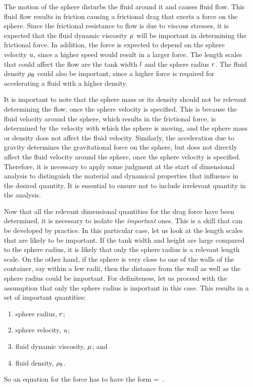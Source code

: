 \begin{solution}
The motion of the sphere disturbs the fluid around it and causes fluid flow. This fluid flow results in friction causing a frictional drag that exerts a force on the sphere. Since the frictional resistance to flow is due to viscous stresses, it is expected that the fluid dynamic viscosity $\mu$ will be important in determining the frictional force. In addition, the force is expected to depend on the sphere velocity $u$, since a higher speed would result in a larger force. The length scales that could affect the flow are the tank width $l$ and the sphere radius $r$. The fluid density $\rho_\text{fl}$ could also be important, since a higher force is required for accelerating a fluid with a higher density.

It is important to note that the sphere mass or its density should not be relevant determining the flow, once the sphere velocity is specified. This is because the fluid velocity around the sphere, which results in the frictional force, is determined by the velocity with which the sphere is moving, and the sphere mass or density does not affect the fluid velocity. Similarly, the acceleration due to gravity determines the gravitational force on the sphere, but does not directly affect the fluid velocity around the sphere, once the sphere velocity is specified. Therefore, it is necessary to apply some judgment at the start of dimensional analysis to distinguish the material and dynamical properties that influence in the desired quantity. It is essential to ensure not to include irrelevant quantity in the analysis.

Now that all the relevant dimensional quantities for the drag force have been determined, it is necessary to isolate the \emph{important} ones. This is a skill that can be developed by practice. In this particular case, let us look at the length scales that are likely to be important. If the tank width and height are large compared to the sphere radius, it is likely that only the sphere radius is a relevant length scale. On the other hand, if the sphere is very close to one of the walls of the container, say within a few radii, then the distance from the wall as well as the sphere radius could be important. For definiteness, let us proceed with the assumption that only the sphere radius is important in this case. This results in a set of important quantities:
\begin{enumerate}
\item sphere radius, $r$; 
\item sphere velocity, $u$;
\item fluid dynamic viscosity, $\mu$; and 
\item fluid density, $\rho_\text{fl}$.
\end{enumerate}
So an equation for the force has to have the form
\beq
\drag = \dimfunc{}\,.
\eeq


\end{solution}
